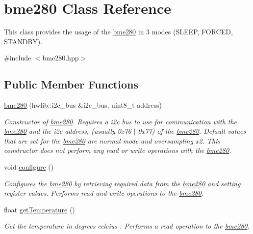 \hypertarget{classbme280}{}\section{bme280 Class Reference}
\label{classbme280}


This class provides the usage of the \hyperlink{classbme280}{bme280} in 3 modes (S\+L\+E\+EP, F\+O\+R\+C\+ED, S\+T\+A\+N\+D\+BY).  




{\ttfamily \#include $<$bme280.\+hpp$>$}

\subsection*{Public Member Functions}
\begin{DoxyCompactItemize}
\item 
\hyperlink{classbme280_a03080355d94cce45ee931426c8d19a08}{bme280} (hwlib\+::i2c\+\_\+bus \&i2c\+\_\+bus, uint8\+\_\+t address)
\begin{DoxyCompactList}\small\item\em Constructor of \hyperlink{classbme280}{bme280}. Requires a i2c bus to use for communication with the \hyperlink{classbme280}{bme280} and the i2c address, (usually 0x76 $\vert$ 0x77) of the \hyperlink{classbme280}{bme280}. Default values that are set for the \hyperlink{classbme280}{bme280} are normal mode and oversampling x2. This constructor does not perform any read or write operations with the \hyperlink{classbme280}{bme280}. \end{DoxyCompactList}\item 
void \hyperlink{classbme280_a8f96a694ae42a08e82b8e585cc9c091e}{configure} ()
\begin{DoxyCompactList}\small\item\em Configures the \hyperlink{classbme280}{bme280} by retrieving required data from the \hyperlink{classbme280}{bme280} and setting register values. Performs read and write operations to the \hyperlink{classbme280}{bme280}. \end{DoxyCompactList}\item 
float \hyperlink{classbme280_a6b62bc13a120c4764d8655a2a4213282}{get\+Temperature} ()
\begin{DoxyCompactList}\small\item\em Get the temperature in degrees celcius . Performs a read operation to the \hyperlink{classbme280}{bme280}. \end{DoxyCompactList}\item 

\end{DoxyCompactItemize}
